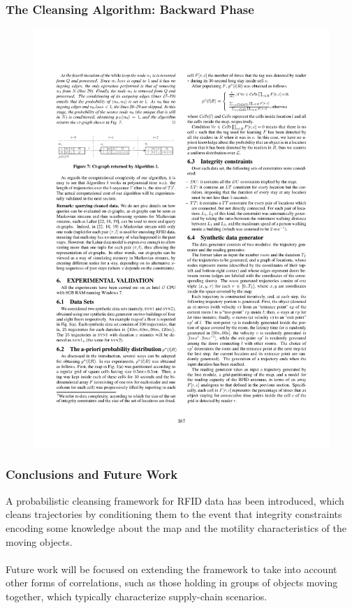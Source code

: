 \begin{frame}
\frametitle{The Cleansing Algorithm: Backward Phase}

\begin{figure}[tb]
  \includegraphics[width=0.8\columnwidth]{figures/3-4/3-4-12.pdf}
\end{figure}

\vspace{-15pt}

\begin{example}
\end{example}

\end{frame}


\begin{frame}
\frametitle{Conclusions and Future Work}

A probabilistic cleansing framework for RFID data has been introduced, which cleans trajectories by conditioning them to the event that integrity constraints encoding some knowledge about the map and the motility characteristics of the moving objects.\\~\\

Future work will be focused on extending the framework to take into account other forms of correlations, such as those holding in groups of objects moving together, which typically characterize supply-chain scenarios.

\end{frame}
